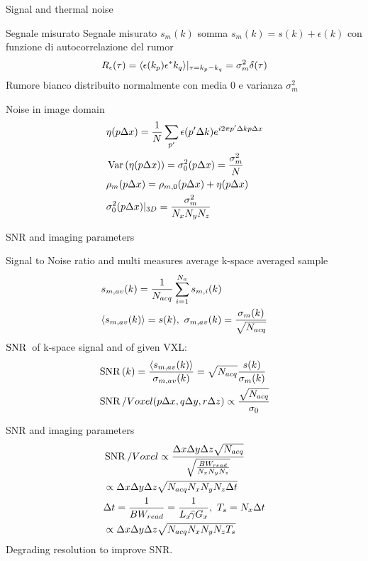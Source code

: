 \begin{frame}[allowframebreaks]{Signal and thermal noise}
\begin{block}{Segnale misurato}
Segnale misurato $s_m(k)$ somma $s_m(k)=s(k)+\epsilon(k)$ con funzione di autocorrelazione del rumor
\begin{equation*}
    R_{\epsilon}(\tau)=\langle \epsilon(k_p)\epsilon^*{k_q} \rangle|_{\tau=k_p-k_q}=\sigma_m^2\delta(\tau)
\end{equation*}
Rumore bianco distribuito normalmente con media 0 e varianza $\sigma_m^2$
\end{block}
\begin{block}{Noise in image domain}
\begin{align*}
&\eta(p\Delta x)=\frac{1}{N}\sum_{p'}\epsilon(p'\Delta k)e^{i2\pi p'\Delta kp\Delta x}\\
&\operatorname{Var}{(\eta(p\Delta x))}=\sigma_0^2(p\Delta x)=\frac{\sigma_m^2}{N}\\
&\rho_m(p\Delta x)=\rho_{m,0}(p\Delta x)+\eta(p\Delta x)\\
&\sigma_0^2(p\Delta x)|_{3D}=\frac{\sigma_m^2}{N_xN_yN_z}
\end{align*}
\end{block}
\end{frame}

\begin{frame}[allowframebreaks]{SNR and imaging parameters}
\begin{block}{Signal to Noise ratio and multi measures average}
k-space averaged sample
\begin{align*}
&s_{m,av}(k)=\frac{1}{N_{acq}}\sum_{i=1}^{N_a}s_{m,i}(k)\\
&\exv{s_{m,av}(k)}=s(k),\ \sigma_{m,av}(k)=\frac{\sigma_m(k)}{\sqrt{N_{acq}}}
\end{align*}
$\operatorname{SNR}{}$ of k-space signal and of given VXL:
\begin{align*}
&\operatorname{SNR}{(k)}=\frac{\langle s_{m,av}(k) \rangle}{\sigma_{m,av}(k)}=\sqrt{N_{acq}}\frac{s(k)}{\sigma_m(k)}\\
&\operatorname{SNR}{}/Voxel{}(p\Delta x, q\Delta y, r\Delta z)\propto\frac{\sqrt{N_{acq}}}{\sigma_0}
\end{align*}
\end{block}
\begin{block}{SNR and imaging parameters}
\begin{align*}
&\SNR{}/\VXL{}\propto\frac{\Delta x\Delta y\Delta z\sqrt{N_{acq}}}{\sqrt{\frac{\BWr{}}{N_xN_yN_z}}}\\
&\propto\Delta x\Delta y\Delta z\sqrt{N_{acq}N_xN_yN_z\Delta t}\\
&\Delta t= \frac{1}{\BW_{read}}=\frac{1}{L_x\gammabar G_x},\ T_s=N_x\Delta t\\
&\propto\Delta x\Delta y\Delta z\sqrt{N_{acq}N_xN_yN_zT_s}
\end{align*}
Degrading resolution to improve SNR.
\end{block}
\end{frame}

